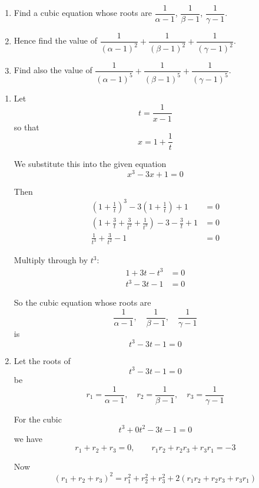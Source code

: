 \documentclass[leqno]{article}
\begin{document}
\begin{enumerate}[
  label=\textbf{\arabic*.},
  leftmargin=*,
  topsep=0pt,
  partopsep=0pt,
  parsep=0pt
]
\begin{enumerate}[label=\textbf{(\alph*)}]
  \item Find a cubic equation whose roots are $\dfrac{1}{\alpha-1}$, $\dfrac{1}{\beta-1}$, $\dfrac{1}{\gamma-1}$.  \\
  \item Hence find the value of $\dfrac{1}{(\alpha-1)^2}+\dfrac{1}{(\beta-1)^2}+\dfrac{1}{(\gamma-1)^2}$.  \\
  \item Find also the value of $\dfrac{1}{(\alpha-1)^5}+\dfrac{1}{(\beta-1)^5}+\dfrac{1}{(\gamma-1)^5}$.  \\
\end{enumerate}

\vspace*{10pt}

\begin{tcolorbox}[colback=white, colframe=scarlet, title={\textbf{Solution}}, breakable, grow to left by=6mm, grow to right by=10mm]
\begin{enumerate}[label=\textbf{(\alph*)}]
  \item Let
\[
t=\frac{1}{x-1}
\]
so that
\[
x=1+\frac{1}{t}
\]

We substitute this into the given equation
\[
x^3-3x+1=0
\]

Then
\begin{align*}
\left(1+\frac{1}{t}\right)^3-3\left(1+\frac{1}{t}\right)+1&=0\\
\left(1+\frac{3}{t}+\frac{3}{t^2}+\frac{1}{t^3}\right)-3-\frac{3}{t}+1&=0\\
\frac{1}{t^3}+\frac{3}{t^2}-1&=0
\end{align*}

Multiply through by $t^3$:
\begin{align*}
1+3t-t^3&=0\\
t^3-3t-1&=0
\end{align*}

So the cubic equation whose roots are
\[
\frac{1}{\alpha-1},\quad \frac{1}{\beta-1},\quad \frac{1}{\gamma-1}
\]
is
\[
t^3-3t-1=0
\]

  \item Let the roots of
\[
t^3-3t-1=0
\]
be
\[
r_1=\frac{1}{\alpha-1},\quad r_2=\frac{1}{\beta-1},\quad r_3=\frac{1}{\gamma-1}
\]

For the cubic
\[
t^3+0t^2-3t-1=0
\]
we have
\[
r_1+r_2+r_3=0,\qquad r_1r_2+r_2r_3+r_3r_1=-3
\]

Now
\[
(r_1+r_2+r_3)^2=r_1^2+r_2^2+r_3^2+2(r_1r_2+r_2r_3+r_3r_1)
\]


\end{enumerate}
\end{tcolorbox}
\end{enumerate}
\end{document}
